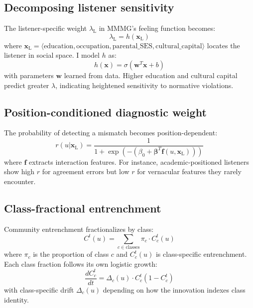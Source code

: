 \documentclass[12pt]{article}
\newcommand{\listener}{\mathrm{L}}
\begin{document}
\subsection{Decomposing listener sensitivity}

The listener-specific weight $\lambda_{\listener}$ in MMMG's feeling function becomes:
\begin{equation}
\lambda_{\listener} = h(\mathbf{x}_{\listener})
\end{equation}
where $\mathbf{x}_{\listener} = \langle \text{education}, \text{occupation}, \text{parental\_SES}, \text{cultural\_capital} \rangle$ locates the listener in social space. I model $h$ as:
\begin{equation}
h(\mathbf{x}) = \sigma(\mathbf{w}^T \mathbf{x} + b)
\end{equation}
with parameters $\mathbf{w}$ learned from data. Higher education and cultural capital predict greater $\lambda$, indicating heightened sensitivity to normative violations.

\subsection{Position-conditioned diagnostic weight}

The probability of detecting a mismatch becomes position-dependent:
\begin{equation}
r(u|\mathbf{x}_{\listener}) = \frac{1}{1 + \exp(-(\beta_0 + \boldsymbol{\beta}^T \mathbf{f}(u, \mathbf{x}_{\listener})))}
\end{equation}
where $\mathbf{f}$ extracts interaction features. For instance, academic-positioned listeners show high $r$ for agreement errors but low $r$ for vernacular features they rarely encounter.

\subsection{Class-fractional entrenchment}

Community entrenchment fractionalizes by class:
\begin{equation}
C^t(u) = \sum_{c \in \text{classes}} \pi_c \cdot C^t_c(u)
\end{equation}
where $\pi_c$ is the proportion of class $c$ and $C^t_c(u)$ is class-specific entrenchment. Each class fraction follows its own logistic growth:
\begin{equation}
\frac{dC^t_c}{dt} = \Delta_c(u) \cdot C^t_c(1 - C^t_c)
\end{equation}
with class-specific drift $\Delta_c(u)$ depending on how the innovation indexes class identity.
\end{document}
